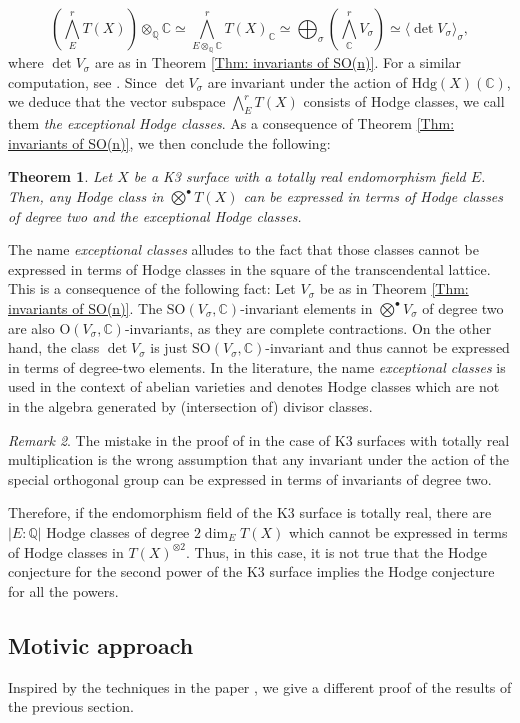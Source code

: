 \documentclass[11pt,twoside,a4paper]{amsart}
\newcommand{\0}{\mathscr{O}}
\newcommand{\Q}{\mathbb{Q}}
\newcommand{\C}{\mathbb{C}}
\newcommand{\s}{\sigma}
\theoremstyle{plain}
\newtheorem{thm}{Theorem}[section]
\theoremstyle{definition}
\theoremstyle{remark}
\newtheorem{rmk}[thm]{Remark}
\begin{document}
\[
\textstyle(\bigwedge^r_{E}T(X))\otimes_\Q\C\simeq\bigwedge^r_{E\otimes_\Q \C}T(X)_\C\simeq \bigoplus_\sigma (\bigwedge^r_\C V_\s) \simeq \langle \det V_\s\rangle_\s,
\]
where $\det V_\s$ are as in Theorem \ref{Thm: invariants of SO(n)}. For a similar computation, see \cite[Prop.\ 4.4]{deligne1982hodge}. 
Since $\det V_\s$ are invariant under the action of $\mathrm{Hdg}(X)(\C)$, we deduce that the vector subspace $\bigwedge^r_{E}T(X)$ consists of Hodge classes, we call them \textit{the exceptional Hodge classes}. 
As a consequence of Theorem \ref{Thm: invariants of SO(n)}, we then conclude the following:
\begin{thm}
\label{generators in the case of totally real K3}
Let $X$ be a K3 surface with a totally real endomorphism field $E$. Then, any Hodge class in $\bigotimes^{\bullet}T(X)$ can be expressed in terms of Hodge classes of degree two and the exceptional Hodge classes.
\end{thm}

The name \textit{exceptional classes} alludes to the fact that those classes cannot be expressed in terms of Hodge classes in the square of the transcendental lattice. This is a consequence of the following fact: Let $V_\s$ be as in Theorem \ref{Thm: invariants of SO(n)}. The $\mathrm{SO}(V_\s,\C)$-invariant elements in $\bigotimes^{\bullet}V_\s$ of degree two are also $\mathrm{O}(V_\s,\C)$-invariants, as they are complete contractions. On the other hand, the class $\det V_\s$ is just $\mathrm{SO}(V_\s,\C)$-invariant and thus cannot be expressed in terms of degree-two elements. In the literature, the name \textit{exceptional classes} is used in the context of abelian varieties and denotes Hodge classes which are not in the algebra generated by (intersection of) divisor classes.
\begin{rmk}
The mistake in the proof of \cite[Prop.\ 5.2]{mari2008hodge} in the case of K3 surfaces with totally real multiplication is the wrong assumption that any invariant under the action of the special orthogonal group can be expressed in terms of invariants of degree two.
\end{rmk}

Therefore, if the endomorphism field of the K3 surface is totally real, there are $|E:\Q|$ Hodge classes of degree $2\dim_E T(X)$ which cannot be expressed in terms of Hodge classes in $T(X)^{\otimes 2}$. Thus, in this case, it is not true that the Hodge conjecture for the second power of the K3 surface implies the Hodge conjecture for all the powers.
\subsection{Motivic approach}
Inspired by the techniques in the paper \cite{milne2021tate}, we give a different proof of the results of the previous section.
\end{document}
